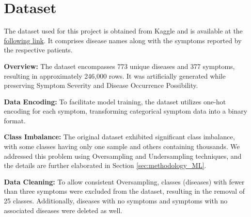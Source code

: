 \section{Dataset}

The dataset used for this project is obtained from Kaggle and is available at the 
\href{https://www.kaggle.com/datasets/dhivyeshrk/diseases-and-symptoms-dataset?select=Final_Augmented_dataset_Diseases_and_Symptoms.csv}{following link}. 
It comprises disease names along with the symptoms reported by the respective patients.

\noindent
\textbf{Overview:} The dataset encompasses 773 unique diseases and 377 symptoms, resulting in approximately 246,000 rows. 
It was artificially generated while preserving Symptom Severity and Disease Occurrence Possibility.

\noindent
\textbf{Data Encoding:} To facilitate model training, the dataset utilizes one-hot encoding for each symptom, transforming 
categorical symptom data into a binary format.

\noindent
\textbf{Class Imbalance:} The original dataset exhibited significant class imbalance, with some classes having only one 
sample and others containing thousands. We addressed this problem using Oversampling and Undersampling techniques,
and the details are further elaborated in Section \ref{sec:methodology_ML}.

\noindent
\textbf{Data Cleaning:} To allow consistent Oversampling, classes (diseases) with fewer than three symptoms were excluded 
from the dataset, resulting in the removal of 25 classes. Additionally, diseases with no symptoms and symptoms with 
no associated diseases were deleted as well.

